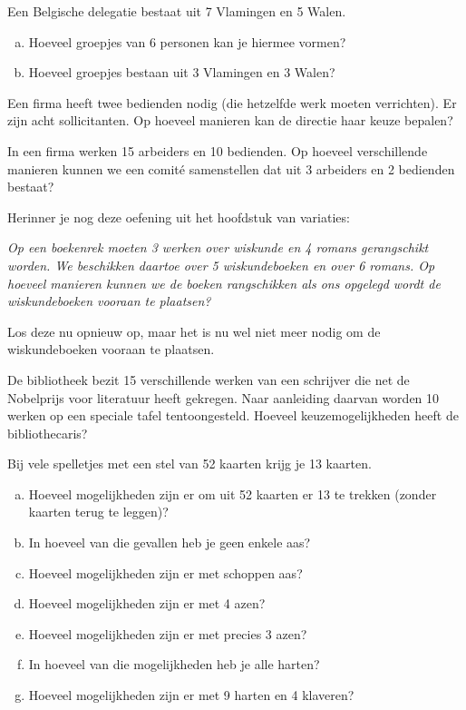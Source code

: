 \documentclass[12pt,a4paper,twoside]{article}
\begin{document}
\begin{oefening}
Een Belgische delegatie bestaat uit 7 Vlamingen en 5 Walen.
\begin{enumerate}[(a)]
  \item Hoeveel groepjes van 6 personen kan je hiermee vormen?
  \item Hoeveel groepjes bestaan uit 3 Vlamingen en 3 Walen?
\end{enumerate}
\end{oefening}

\begin{oefening}
Een firma heeft twee bedienden nodig (die hetzelfde werk moeten verrichten). Er zijn acht sollicitanten. Op hoeveel manieren kan de directie haar keuze bepalen?
\end{oefening}

\begin{oefening}
In een firma werken 15 arbeiders en 10 bedienden. Op hoeveel verschillende manieren kunnen we een comité samenstellen dat uit 3 arbeiders en 2 bedienden bestaat?
\end{oefening}

\begin{oefening}
Herinner je nog deze oefening uit het hoofdstuk van variaties:

{\em Op een boekenrek moeten 3 werken over wiskunde en 4 romans gerangschikt worden. We beschikken daartoe over 5 wiskundeboeken en over 6 romans. Op hoeveel manieren kunnen we de boeken rangschikken als ons opgelegd wordt de wiskundeboeken vooraan te plaatsen?}

Los deze nu opnieuw op, maar het is nu wel niet meer nodig om de wiskundeboeken vooraan te plaatsen.
\end{oefening}

\begin{oefening}
De bibliotheek bezit 15 verschillende werken van een schrijver die net de Nobelprijs voor literatuur heeft gekregen. Naar aanleiding daarvan worden 10 werken op een speciale tafel tentoongesteld. Hoeveel keuzemogelijkheden heeft de bibliothecaris?
\end{oefening}

\begin{oefening}
Bij vele spelletjes met een stel van 52 kaarten krijg je 13 kaarten.
\begin{enumerate}[(a)]
  \item Hoeveel mogelijkheden zijn er om uit 52 kaarten er 13 te trekken (zonder kaarten terug te leggen)?
  \item In hoeveel van die gevallen heb je geen enkele aas?
  \item Hoeveel mogelijkheden zijn er met schoppen aas?
  \item Hoeveel mogelijkheden zijn er met 4 azen?
  \item Hoeveel mogelijkheden zijn er met precies 3 azen?
  \item In hoeveel van die mogelijkheden heb je alle harten?
  \item Hoeveel mogelijkheden zijn er met 9 harten en 4 klaveren?
\end{enumerate}
\end{oefening}
\end{document}
